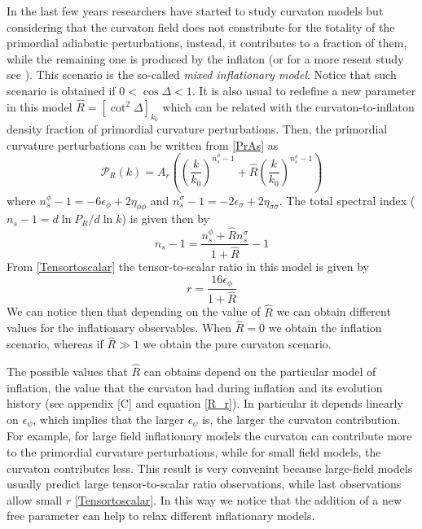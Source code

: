 \documentclass[amssymb,twocolumn,prd,nofootinbib,showpacs]{revtex4-1}
\begin{document}
In the last few years researchers have started to study curvaton models but considering that the curvaton field does not constribute for the totality of the primordial adiabatic perturbations, instead, it contributes to a fraction of them, while the remaining one is produced by the inflaton \cite{curvaton4,curvaton5,curvaton6,curvaton7,curvaton8} (or for a more resent study see \cite{curvaton3}). This scenario is the so-called \textit{mixed inflationary model}. Notice that such scenario is obtained if $0<\cos\Delta <1$. It is also usual to redefine a new parameter in this model $\hat R= [\cot^2\Delta]_{k_0}$ which can be related with the curvaton-to-inflaton density fraction of primordial curvature perturbations. Then, the primordial curvature perturbations can be written from \eqref{PrAs} as
\begin{equation}\label{PCr}
\mathcal{P}_R(k)=A_r\left(\left(\frac{k}{k_{0}}\right)^{n_s^\phi-1}+\hat R\left(\frac{k}{k_{0}}\right)^{n_s^\sigma-1}\right)
\end{equation}
where $n_s^\phi-1 = -6\epsilon_\phi+2\eta_{\phi\phi}$ and $n_s^\sigma-1 = -2\epsilon_\sigma+2\eta_{\sigma\sigma}$.
The total spectral index ($n_s-1=d\ln P_R/d\ln k$) is given then by
\begin{equation}
n_s-1=\frac{n_s^\phi+\hat R n_s^\sigma}{1+\hat R}-1
\end{equation}
From \eqref{Tensortoscalar} the tensor-to-scalar ratio in this model is given by
\begin{equation}\label{tensortoscalar}
r=\frac{16\epsilon_\phi}{1+\hat R}
\end{equation}		
We can notice then that depending on the value of $\hat R$ we can obtain different values for the inflationary observables. When $\hat R=0$ we obtain the inflation scenario, whereas if $\hat R\gg 1$ we obtain the pure curvaton scenario.  

The possible values that $\hat R$ can obtains depend on the particular model of inflation, the value that the curvaton had during inflation and its evolution history (see appendix [C] and equation \eqref{R_r}). In particular it depends linearly on $\epsilon_\psi$, which implies that the larger $\epsilon_\psi$ is, the larger the curvaton contribution. For example, for large field inflationary models the curvaton can contribute more to the primordial curvature perturbations, while for small field models, the curvaton contributes less. This result is very convenint because large-field models usually predict large tensor-to-scalar ratio observations, while last observations allow small $r$ \eqref{Tensortoscalar}. In this way we notice that the addition of a new free parameter can help to relax different inflationary models.  
\end{document}
